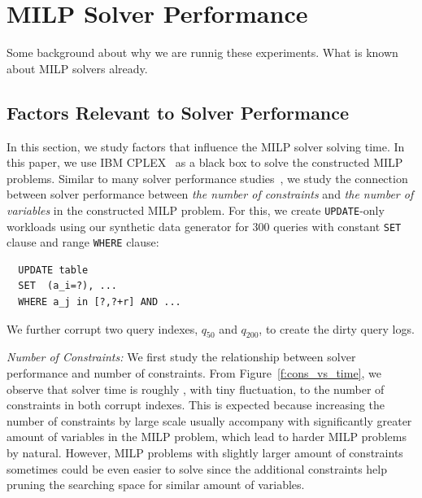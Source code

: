 \section{MILP Solver Performance}
\label{app:solvtime}

Some background about why we are runnig these experiments.  What is known about MILP solvers already.

\subsection{Factors Relevant to Solver Performance}

In this section, we study factors that influence the MILP solver solving time. In this paper, we
use IBM CPLEX~\cite{cplex2014v12} as a black box to solve the constructed MILP problems.   Similar to many solver performance studies~\cite{atamturk2005integer, meindl2012analysis, gearhart2013comparison}, 
we  study the connection between solver performance between \textit{the number of constraints} and \textit{the number of variables} in the constructed MILP problem. For this, we create \texttt{UPDATE}-only workloads  using our synthetic data generator for 300 queries with constant \texttt{SET} clause and range \texttt{WHERE} clause: 

{\scriptsize
\begin{verbatim}
  UPDATE table
  SET  (a_i=?), ...
  WHERE a_j in [?,?+r] AND ...
\end{verbatim}
}
We further corrupt two query indexes, $q_{50}$ and $q_{200}$, to create the dirty query logs.  


\smallskip
\emph{Number of Constraints: } We first study the relationship between solver performance and number of constraints.  From Figure~\ref{f:cons_vs_time}, we observe that solver time  is roughly , with tiny fluctuation, to the number of constraints in both corrupt indexes. This is expected because increasing the number of constraints by large scale usually accompany with significantly greater amount of variables in the MILP problem, which lead to harder MILP problems by natural. However, MILP problems  with slightly larger amount of constraints sometimes could be even easier to solve since the additional constraints help pruning the searching space for similar amount of variables.

